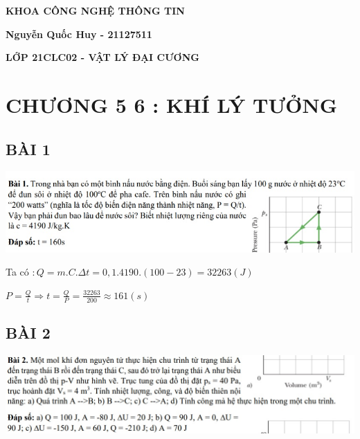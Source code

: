 \documentclass[12pt,a4paper]{article}
\begin{document}
\thispagestyle{empty}
\begin{LARGE}
    \begin{center}{\underline{\color{red}{\bf NATIONAL UNIVERSITY OF HO CHI MINH CITY}}}
    \end{center}
\end{LARGE}
\vspace*{1cm}
\begin{center}{\Huge \color{green}\textbf{KHOA CÔNG NGHỆ THÔNG TIN}}
\end{center}
\vspace*{15cm}
\begin{center}{\Huge \color{cyan}\textbf{Nguyễn Quốc Huy - 21127511}}
\end{center}
\vspace*{1cm}
\begin{center}
    {\Huge \color{cyan}\textbf{{LỚP 21CLC02 - VẬT LÝ ĐẠI CƯƠNG}}}
\end{center}
\newpage
\let\cleardoublepage\clearpage

\tableofcontents

\newpage
\section{\textbf{\color{red}CHƯƠNG 5 6 : KHÍ LÝ TƯỞNG}}
\Large \subsection{\color{blue}\textbf{BÀI 1} }
\includegraphics[scale=1]{No.1.jpg}

Ta có $: Q = m.C.\Delta t = 0,1.4190.(100 - 23) = 32263 (J)$

\vspace*{1cm}
$ P = \frac{Q}{t} \Rightarrow t = \frac{Q}{P} = \frac{32263}{200} \approx 161 (s)$
\Large \subsection{\color{blue}\textbf{BÀI 2} }
\includegraphics[scale=1]{No.2.jpg}
\end{document}
